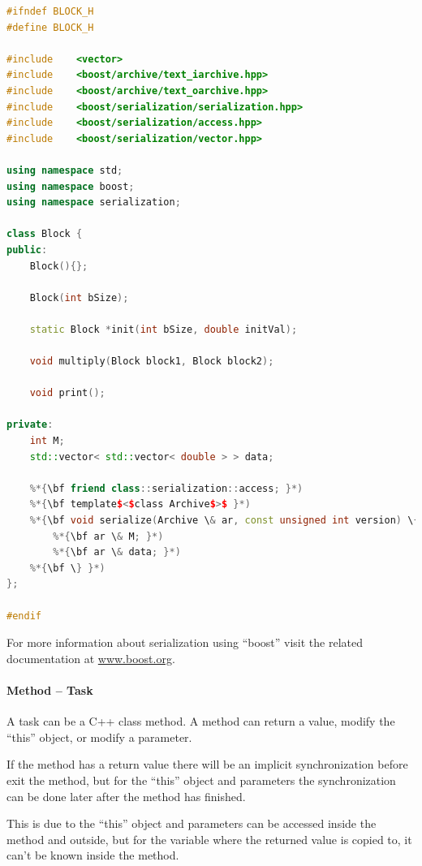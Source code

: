 \begin{lstlisting}[language=C++]
#ifndef BLOCK_H
#define BLOCK_H

#include    <vector>
#include    <boost/archive/text_iarchive.hpp>
#include    <boost/archive/text_oarchive.hpp>
#include    <boost/serialization/serialization.hpp>
#include    <boost/serialization/access.hpp>
#include    <boost/serialization/vector.hpp>

using namespace std;
using namespace boost;
using namespace serialization;

class Block {
public:
    Block(){};

    Block(int bSize);
       
    static Block *init(int bSize, double initVal);
        
    void multiply(Block block1, Block block2);
        
    void print();

private:
    int M;
    std::vector< std::vector< double > > data;
        
    %*{\bf friend class::serialization::access; }*)
    %*{\bf template$<$class Archive$>$ }*)
    %*{\bf void serialize(Archive \& ar, const unsigned int version) \{ }*)
        %*{\bf ar \& M; }*)
        %*{\bf ar \& data; }*)
    %*{\bf \} }*)
};

#endif
\end{lstlisting}

For more information about serialization using ``boost'' visit the related documentation at \url{www.boost.org}.


\paragraph{Method – Task}

A task can be a C++ class method. A method can return a value, modify the “this” object, or modify a parameter.

If the method has a return value there will be an implicit synchronization before exit the method, 
but for the “this” object and parameters the synchronization can be done later after the method has finished.

This is due to the ``this'' object and parameters can be accessed inside the method and outside, but for the 
variable where the returned value is copied to, it can’t be known inside the method.


